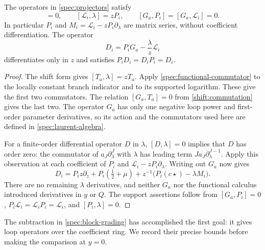 \begin{proposition}
\label{spec:commutators}
The operators in \eqref{spec:projectors} satisfy
\begin{equation}
 [P_i,\lambda]=0,\qquad
 [\mathscr L_i,\lambda]=zP_i,\qquad
 [G_a,P_i]=[G_a,\mathscr L_i]=0.
 \label{spec:block-commutators}
\end{equation}
In particular $P_i$ and
$M_i=\mathscr L_i-zP_i\partial_\lambda$ are matrix series,
without coefficient differentiation.  The operator
\begin{equation}
 D_i=P_iG_a-\frac{\lambda}{z}\mathscr L_i
 \label{spec:block-grading}
\end{equation}
differentiates only in $z$ and satisfies
$P_iD_i=D_iP_i=D_i$.
\end{proposition}

\begin{proof}
The shift form gives $[T_a,\lambda]=zT_a$.
Apply \eqref{spec:functional-commutator} to the locally constant
branch indicator and to its supported logarithm.  These give the
first two commutators.  The relation
$[G_a,T_a]=0$ from \eqref{shift:commutation} gives the last two.
The operator $G_a$ has only one negative loop power and first-order
parameter derivatives, so its action and the commutators used here
are defined in \eqref{spec:laurent-algebra}.

For a finite-order differential operator $D$ in $\lambda$,
$[D,\lambda]=0$ implies that $D$ has order zero: the commutator of
$a_J\partial_\lambda^J$ with $\lambda$ has leading term
$J a_J\partial_\lambda^{J-1}$.  Apply this observation at each
coefficient of $P_i$ and $\mathscr L_i-zP_i\partial_\lambda$.
Writing out $G_a$ now gives
\begin{equation}
 D_i=P_i z\partial_z
       +P_i(\tfrac12+\mu)
       +z^{-1}\bigl(P_i(c\star)-\lambda M_i\bigr).
 \label{spec:grading-matrix-form}
\end{equation}
There are no remaining $\lambda$ derivatives, and neither $G_a$ nor
the functional calculus introduced derivatives in $y$ or $Q$.
The support assertions follow from $[G_a,P_i]=0$,
$P_i\mathscr L_i=\mathscr L_iP_i=\mathscr L_i$, and
$[P_i,\lambda]=0$.
\end{proof}

The subtraction in \eqref{spec:block-grading} has accomplished the
first goal: it gives loop operators over the coefficient ring.
We record their precise bounds before making the comparison at
$y=0$.

